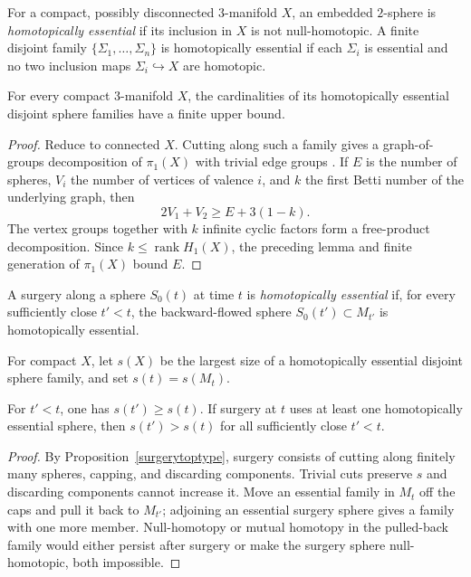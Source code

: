\begin{definition}
\label{def:homotopically-essential-family}
For a compact, possibly disconnected $3$-manifold $X$, an embedded $2$-sphere
is \emph{homotopically essential} if its inclusion in $X$ is not null-homotopic.
A finite disjoint family $\{\Sigma_1,\ldots,\Sigma_n\}$ is homotopically
essential if each $\Sigma_i$ is essential and no two inclusion maps
$\Sigma_i\hookrightarrow X$ are homotopic.
\end{definition}

\begin{lemma}
\label{lem:homotopically-essential-family-finite}
For every compact $3$-manifold $X$, the cardinalities of its homotopically
essential disjoint sphere families have a finite upper bound.
\end{lemma}
\begin{proof}
\sketch Reduce to connected $X$. Cutting along such a family gives a graph-of-groups
decomposition of $\pi_1(X)$ with trivial edge groups \cite{Hatcher}. If $E$ is
the number of spheres, $V_i$ the number of vertices of valence $i$, and $k$ the
first Betti number of the underlying graph, then
\[
2V_1+V_2\ge E+3(1-k).
\]
The vertex groups together with $k$ infinite cyclic factors form a free-product
decomposition. Since $k\le\operatorname{rank}H_1(X)$, the preceding lemma and
finite generation of $\pi_1(X)$ bound $E$.
\end{proof}

\begin{definition}
\label{def:homotopically-essential-surgery}
A surgery along a sphere $S_0(t)$ at time $t$ is \emph{homotopically
essential} if, for every sufficiently close $t'<t$, the backward-flowed sphere
$S_0(t')\subset M_{t'}$ is homotopically essential.
\end{definition}

For compact $X$, let $s(X)$ be the largest size of a homotopically essential
disjoint sphere family, and set $s(t)=s(M_t)$.

\begin{claim}
\label{claim:invariant-s-monotone}
For $t'<t$, one has $s(t')\ge s(t)$. If surgery at $t$ uses at least one
homotopically essential sphere, then $s(t')>s(t)$ for all sufficiently close
$t'<t$.
\end{claim}
\begin{proof}
\sketch By Proposition~\ref{surgerytoptype}, surgery consists of cutting along finitely
many spheres, capping, and discarding components. Trivial cuts preserve $s$ and
discarding components cannot increase it. Move an essential family in $M_t$
off the caps and pull it back to $M_{t'}$; adjoining an essential surgery sphere
gives a family with one more member. Null-homotopy or mutual homotopy in the
pulled-back family would either persist after surgery or make the surgery
sphere null-homotopic, both impossible.
\end{proof}

